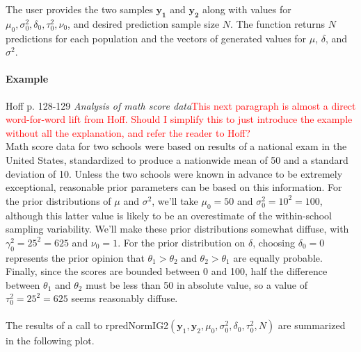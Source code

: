 \documentclass[12pt, a4paper]{article}
\begin{document}
      The user provides the two samples $\mathbf{y_1}$ and $\mathbf{y_2}$ along with values for $\mu_0, \sigma^2_0, \delta_0, \tau^2_0, \nu_0$, and desired prediction sample size $N$.  The function returns $N$ predictions for each population and the vectors of generated values for $\mu$, $\delta$, and $\sigma^2$.

      \paragraph{Example}

      Hoff p. 128-129 \textit{Analysis of math score data}\textcolor{red}{This next paragraph is almost a direct word-for-word lift from Hoff.  Should I simplify this to just introduce the example without all the explanation, and refer the reader to Hoff?}\\
      Math score data for two schools were based on results of a national exam in the United States, standardized to produce a nationwide mean of 50 and a standard deviation of 10.  Unless the two schools were known in advance to be extremely exceptional, reasonable prior parameters can be based on this information.  For the prior distributions of $\mu$ and $\sigma^2$, we'll take $\mu_0 = 50$ and $\sigma^2_0 = 10^2 = 100$, although this latter value is likely to be an overestimate of the within-school sampling variability.  We'll make these prior distributions somewhat diffuse, with $\gamma^2_0 = 25^2 = 625$ and $\nu_0 = 1$.  For the prior distribution on $\delta$, choosing $\delta_0 = 0$ represents the prior opinion that $\theta_1 > \theta_2$ and $\theta_2 > \theta_1$ are equally probable.  Finally, since the scores are bounded between 0 and 100, half the difference between $\theta_1$ and $\theta_2$ must be less than 50 in absolute value, so a value of $\tau^2_0 = 25^2 = 625$ seems reasonably diffuse.\\\\
      The results of a call to rpredNormIG2$\left(\mathbf{y}_1,\mathbf{y}_2,\mu_0,\sigma^2_0,\delta_0,\tau^2_0,N\right)$ are summarized in the following plot.\\
\end{document}
